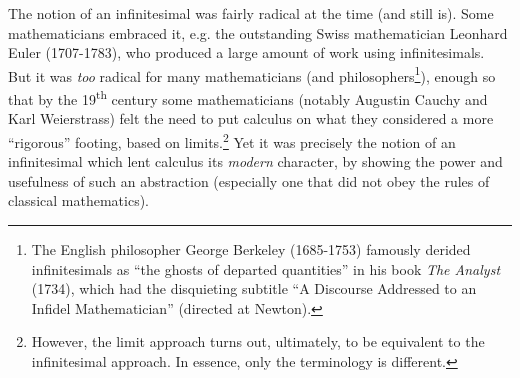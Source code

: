 The notion of an infinitesimal was fairly radical at the time (and still is).
Some mathematicians embraced it, e.g. the outstanding Swiss
mathematician Leonhard Euler (1707-1783), who produced a large amount of work
using infinitesimals. But it was \emph{too} radical for
many mathematicians (and philosophers\footnote{The English philosopher George
Berkeley (1685-1753) famously derided infinitesimals as ``the ghosts of departed
quantities'' in his book \emph{The Analyst} (1734), which had the disquieting
subtitle ``A Discourse Addressed to an Infidel Mathematician'' (directed at
Newton).}), enough so
that by the 19\textsuperscript{th} century some mathematicians (notably Augustin
Cauchy and Karl Weierstrass) felt the need to put calculus on what they
considered a more ``rigorous'' footing, based on limits.\footnote{However, the
limit approach turns out, ultimately, to be equivalent to the infinitesimal
approach. In essence, only the terminology is different.}
Yet it was precisely the notion of an infinitesimal which lent calculus
its \emph{modern} character, by showing the power and usefulness of such an
abstraction (especially one that did not obey the rules of classical
mathematics).\vspace{3mm}

